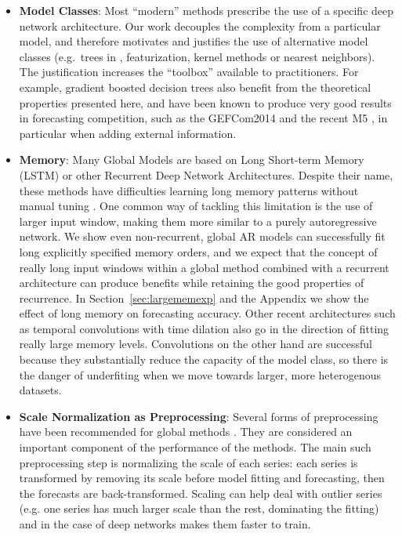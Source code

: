 \documentclass[a4paper]{article}
\theoremstyle{custom}
\begin{document}
\begin{itemize}
\item \textbf{Model Classes}: Most ``modern'' methods prescribe the use of a specific deep network architecture. Our work decouples the complexity from a particular model, and therefore motivates and justifies the use of alternative model classes (e.g.\ trees in \cite{mafildes2019customer}, featurization, kernel methods or nearest neighbors). The justification increases the ``toolbox'' available to practitioners. For example, gradient boosted decision trees also benefit from the theoretical properties presented here, and have been known to produce very good results in forecasting competition, such as the GEFCom2014 \cite{landry2016probabilistic} and the recent M5 \cite{M5kaggle}, in particular when adding external information.

\item \textbf{Memory}: Many Global Models are based on Long Short-term Memory (LSTM) or other Recurrent Deep Network Architectures. Despite their name, these methods have difficulties learning long memory patterns without manual tuning \cite{trinh2018learning}. One common way of tackling this limitation is the use of larger input window, making them more similar to a purely autoregressive network. We show even non-recurrent, global AR models can successfully fit long explicitly specified memory orders, and we expect that the concept of really long input windows within a global method combined with a recurrent architecture can produce benefits while retaining the good properties of recurrence. In Section~\ref{sec:largememexp} and the Appendix we show the effect of long memory on forecasting accuracy. Other recent architectures such as temporal convolutions with time dilation \cite{oord2016wavenet, borovykh2018dilated} also go in the direction of fitting really large memory levels. Convolutions on the other hand are successful because they substantially reduce the capacity of the model class, so there is the danger of underfiting when we move towards larger, more heterogenous datasets.

\item \textbf{Scale Normalization as Preprocessing}: Several forms of preprocessing have been recommended for global methods \cite{duncan2001forecasting, salinas2019DeepAR, smyl2020hybrid, hewamalage2019recurrent, rabanser2020effectiveness}. They are considered an important component of the performance of the methods. The main such preprocessing step is normalizing the scale of each series: each series is transformed by removing its scale before model fitting and forecasting, then the forecasts are back-transformed. Scaling can help deal with outlier series (e.g. one series has much larger scale than the rest, dominating the fitting) and in the case of deep networks makes them faster to train.


\end{itemize}
\end{document}
